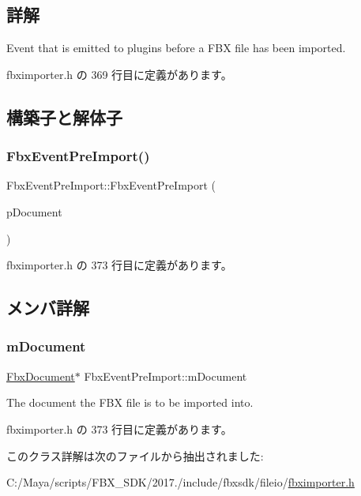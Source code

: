 \subsection{詳解}
Event that is emitted to plugins before a F\+BX file has been imported. 

 fbximporter.\+h の 369 行目に定義があります。



\subsection{構築子と解体子}
\mbox{\label{class_fbx_event_pre_import_a67755900fb239a5c7d67b8e22d92eb60}} 
\subsubsection{\texorpdfstring{Fbx\+Event\+Pre\+Import()}{FbxEventPreImport()}}
{\footnotesize\ttfamily Fbx\+Event\+Pre\+Import\+::\+Fbx\+Event\+Pre\+Import (\begin{DoxyParamCaption}\item[{\hyperlink{class_fbx_document}{Fbx\+Document} $\ast$}]{p\+Document }\end{DoxyParamCaption})\hspace{0.3cm}{\ttfamily [inline]}}



 fbximporter.\+h の 373 行目に定義があります。



\subsection{メンバ詳解}
\mbox{\label{class_fbx_event_pre_import_a89b454dc61f00b64cc8a8f951e5e1003}} 
\subsubsection{\texorpdfstring{m\+Document}{mDocument}}
{\footnotesize\ttfamily \hyperlink{class_fbx_document}{Fbx\+Document}$\ast$ Fbx\+Event\+Pre\+Import\+::m\+Document}



The document the F\+BX file is to be imported into. 



 fbximporter.\+h の 373 行目に定義があります。



このクラス詳解は次のファイルから抽出されました\+:\begin{DoxyCompactItemize}
\item 
C\+:/\+Maya/scripts/\+F\+B\+X\+\_\+\+S\+D\+K/2017./include/fbxsdk/fileio/\hyperlink{fbximporter_8h}{fbximporter.\+h}\end{DoxyCompactItemize}

